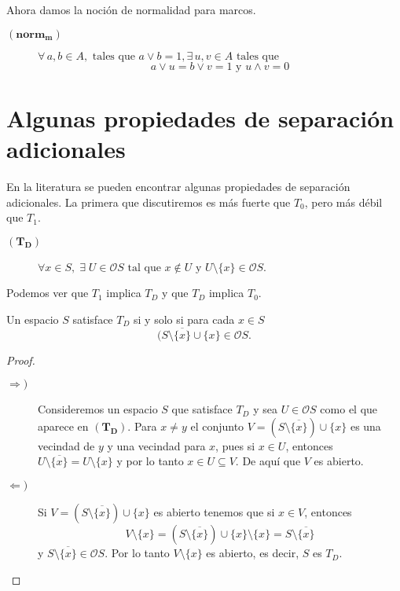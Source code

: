 \documentclass{comunicaciones}
\begin{document}
Ahora damos la noción de normalidad para marcos.

\begin{description}
\item[$(\mathbf{norm_m})$] $\forall\, a, b\in A, \mbox{ tales que } a\vee b=1, \exists\, u, v\in A\mbox{ tales que }$
\[
 a\vee u=b\vee v=1 \mbox{ y } u\wedge v=0
\]
\end{description}

\section{Algunas propiedades de separación adicionales}
En la literatura se pueden encontrar algunas propiedades de separación adicionales. La primera que discutiremos es más fuerte que $T_0$, pero más débil que $T_1$.

\begin{description}
\item[$(\mathbf{T_D})$] $\forall x\in S,\; \exists\; U\in \mathcal{O}S \mbox{ tal que } x\notin U \mbox{ y } U\setminus\{x\} \in \mathcal{O}S$.
\end{description}

Podemos ver que $T_1$ implica $T_D$ y que $T_D$ implica $T_0$.

\begin{prop}
    Un espacio $S$ satisface $T_D$ si y solo si para cada $x\in S$
    \[
    (S\setminus \overline{\{x\}}\cup \{x\}\in \mathcal{O}S.
    \]
\end{prop}

\begin{proof}
\begin{description}
    \item[$\Rightarrow )$] Consideremos un espacio $S$ que satisface $T_D$ y sea $U\in \mathcal{O}S$ como el que aparece en $(\mathbf{T_D})$. Para $x\neq y$ el conjunto $V=(S\setminus \overline{\{x\}})\cup \{x\}$ es una vecindad de $y$ y una vecindad para $x$, pues si $x\in U$, entonces $U\setminus \overline{\{x\}}=U\setminus \{x\}$ y por lo tanto $x\in U\subseteq V$. De aquí que $V$ es abierto.
    \item[$\Leftarrow )$] Si $V=(S\setminus \overline{\{x\}})\cup \{x\}$ es abierto tenemos que si $x\in V$, entonces 
    \[
    V\setminus \{x\}=(S\setminus \overline{\{x\}})\cup \{x\}\setminus\{x\}=S\setminus \overline{\{x\}}
    \]
    y $S\setminus \overline{\{x\}}\in \mathcal{O}S$. Por lo tanto  $V\setminus \{x\}$ es abierto, es decir, $S$ es $T_D$.
\end{description}
\end{proof}
\end{document}

